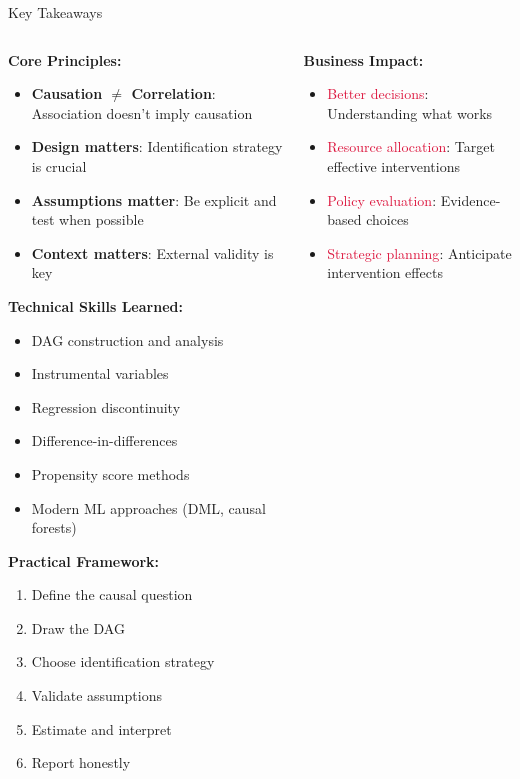 \documentclass[aspectratio=169,11pt]{beamer}
\begin{document}
\begin{frame}{Key Takeaways}
\begin{columns}
\begin{column}{0.5\textwidth}
\textbf{Core Principles:}
\begin{itemize}
\item \textcolor{forest}{\textbf{Causation $\neq$ Correlation}}: Association doesn't imply causation
\item \textcolor{forest}{\textbf{Design matters}}: Identification strategy is crucial
\item \textcolor{forest}{\textbf{Assumptions matter}}: Be explicit and test when possible
\item \textcolor{forest}{\textbf{Context matters}}: External validity is key
\end{itemize}

\vspace{0.3cm}
\textbf{Technical Skills Learned:}
\begin{itemize}
\item DAG construction and analysis
\item Instrumental variables
\item Regression discontinuity
\item Difference-in-differences
\item Propensity score methods
\item Modern ML approaches (DML, causal forests)
\end{itemize}

\vspace{0.3cm}
\textbf{Practical Framework:}
\begin{enumerate}
\item Define the causal question
\item Draw the DAG
\item Choose identification strategy
\item Validate assumptions
\item Estimate and interpret
\item Report honestly
\end{enumerate}
\end{column}
\begin{column}{0.5\textwidth}
\textbf{Business Impact:}
\begin{itemize}
\item \textcolor{crimson}{Better decisions}: Understanding what works
\item \textcolor{crimson}{Resource allocation}: Target effective interventions
\item \textcolor{crimson}{Policy evaluation}: Evidence-based choices
\item \textcolor{crimson}{Strategic planning}: Anticipate intervention effects
\end{itemize}


\end{column}
\end{columns}
\end{frame}
\end{document}
